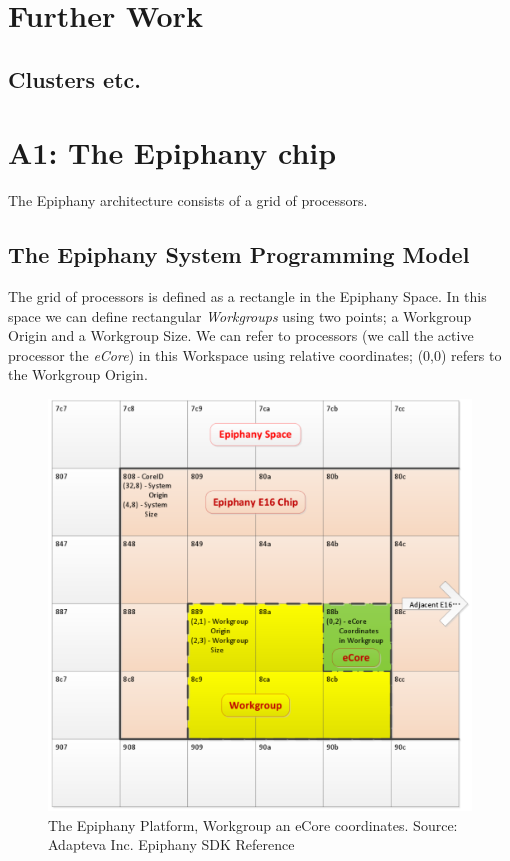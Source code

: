 \documentclass{article}
\renewcommand{\(}{\left(}
\renewcommand{\)}{\right)}
\begin{document}
\section{Further Work}

\subsection{Clusters etc.}

\section{A1: The Epiphany chip}
The Epiphany architecture consists of a grid of processors.
\subsection{The Epiphany System Programming Model}
The grid of processors is defined as a rectangle in the Epiphany Space. In this space we can define rectangular \textit{Workgroups} using two points; a Workgroup Origin and a Workgroup Size. We can refer to processors (we call the active processor the \textit{eCore}) in this Workspace using relative coordinates; (0,0) refers to the Workgroup Origin.

\begin{centering}
\begin{figure}
\centering
\includegraphics[scale=0.5]{EpiphanySpace.pdf}
\caption{The Epiphany Platform, Workgroup an eCore coordinates. Source: Adapteva Inc. Epiphany SDK Reference}
\end{figure}
\end{centering}
\end{document}
